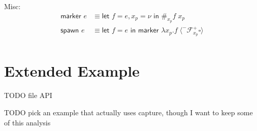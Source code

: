 \documentclass[11pt]{article}
\newcommand\x{\lambda x}
\newcommand{\letin}[2]{\textsf{let }#1\textsf{ in }#2}
\newcommand\F{\mathcal{F}}
\newcommand{\angles}[1]{\langle#1\rangle}
\begin{document}
Misc:
\begin{align*}
\textsf{marker }e &\equiv
	\letin{f=e, x_p=\nu}{\#_{x_p}f\;x_p} \\
\textsf{spawn }e &\equiv
	\letin{f=e}{\textsf{marker }\x_p.f\;\angles{^-\F^+_{x_p}\square}}
	\\
\end{align*}

























\section{Extended Example}
\label{sec:foldl/ee}

TODO file API

TODO pick an example that actually uses capture, though I want to keep some of this analysis
\end{document}

